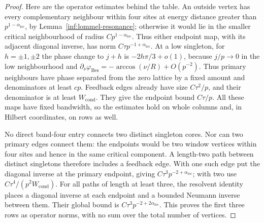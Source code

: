 \begin{proof}
Here are the operator estimates behind the table. An outside vertex
has every complementary neighbour within four sites at energy
distance greater than $p^{1-\alpha_{\mathrm{loc}}}$, by
Lemma~\ref{inf:lommel-resonance}; otherwise it would lie in the
smaller critical neighbourhood of radius $Cp^{1-\alpha_{\mathrm{loc}}}$.
Thus either endpoint map, with its adjacent diagonal inverse,
has norm $C\tau p^{-1+\alpha_{\mathrm{loc}}}$.
At a low singleton, for $h=\pm1,\pm2$ the phase change to $j+h$
is $-2h\pi/3+o(1)$, because $j/p\to0$ in the low neighbourhood
and $\partial_\nu\varphi_{\mathrm{Bes}}=-\arccos(\nu/R)+O(p^{-2})$.
Thus primary neighbours have phase separated from the zero lattice
by a fixed amount and denominators at least $cp$.
Feedback edges
already have size $C\tau^2/p$, and their denominator is at least
$W_{\mathrm{cond}}$. They give the endpoint bound $C\tau/p$.
All these maps have fixed bandwidth, so the estimates hold on
whole columns and, in Hilbert coordinates, on rows as well.

No direct band-four entry connects two distinct singleton cores.
Nor can two primary edges connect them: the endpoints would be
two window vertices within four sites and hence in the same
critical component. A length-two path between distinct singletons
therefore includes a feedback edge. With one such edge put the
diagonal inverse at the primary endpoint, giving
$C\tau^3p^{-2+\alpha_{\mathrm{loc}}}$; with two use
$C\tau^4/(p^2W_{\mathrm{cond}})$.
For all paths of length at least three, the resolvent identity
places a diagonal inverse at each endpoint and a bounded
Neumann inverse between them. Their global bound is
$C\tau^3p^{-2+2\alpha_{\mathrm{loc}}}$.
This proves the first three rows as operator norms, with no
sum over the total number of vertices.


\end{proof}

